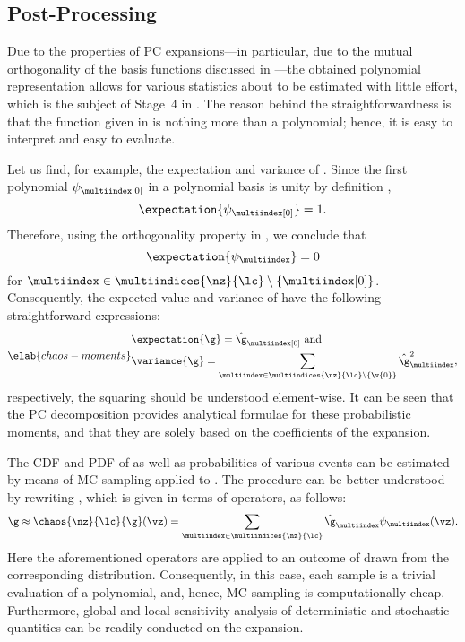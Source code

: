 \subsection{Post-Processing}

Due to the properties of \ac{PC} expansions---in particular, due to the mutual
orthogonality of the basis functions discussed in ---the
obtained polynomial representation allows for various statistics about \g to be
estimated with little effort, which is the subject of Stage~4 in
. The reason behind the straightforwardness is that the
function given in  is nothing more than a polynomial;
hence, it is easy to interpret and easy to evaluate.

Let us find, for example, the expectation and variance of \g. Since the first
polynomial $\psi_{\multiindex[0]}$ in a polynomial basis is unity by definition
\cite{xiu2010},
\[
  \expectation{\psi_{\multiindex[0]}} = 1.
\]
Therefore, using the orthogonality property in , we
conclude that
\[
  \expectation{\psi_{\multiindex}} = 0
\]
for $\multiindex \in \multiindices{\nz}{\lc} \setminus \{ \multiindex[0] \}$.
Consequently, the expected value and variance of \g have the following
straightforward expressions:
\begin{equation} \elab{chaos-moments}
  \begin{split}
    & \expectation{\g} = \hat{\g}_{\multiindex[0]} \text{ and} \\
    & \variance{\g} = \sum_{\multiindex \in \multiindices{\nz}{\lc} \setminus \{ \v{0} \}} \hat{\g}_{\multiindex}^2,
  \end{split}
\end{equation}
respectively, the squaring should be understood element-wise. It can be seen
that the \ac{PC} decomposition provides analytical formulae for these
probabilistic moments, and that they are solely based on the coefficients of the
expansion.

The \ac{CDF} and \ac{PDF} of \g as well as probabilities of various events can
be estimated by means of \ac{MC} sampling applied to . The
procedure can be better understood by rewriting , which is
given in terms of operators, as follows:
\[
  \g \approx \chaos{\nz}{\lc}{\g}(\vz) = \sum_{\multiindex \in \multiindices{\nz}{\lc}} \hat{\g}_{\multiindex} \psi_{\multiindex}(\vz).
\]
Here the aforementioned operators are applied to an outcome of \vz drawn from
the corresponding distribution. Consequently, in this case, each sample is a
trivial evaluation of a polynomial, and, hence, \ac{MC} sampling is
computationally cheap. Furthermore, global and local sensitivity analysis of
deterministic and stochastic quantities can be readily conducted on the
expansion.

